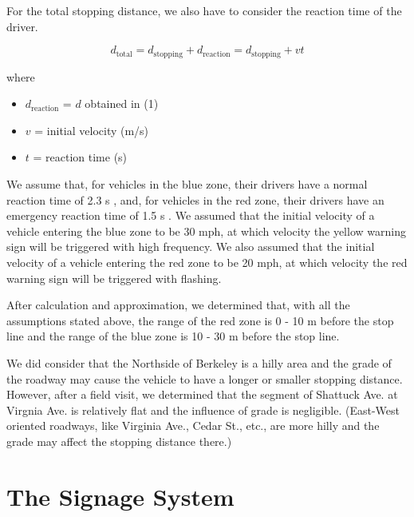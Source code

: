 \documentclass{article}
\begin{document}
For the total stopping distance, we also have to consider the reaction time of the driver.

\begin{equation}
d_{\text{total}} = d_{\text{stopping}} + d_{\text{reaction}} = d_{\text{stopping}} + vt
\end{equation}

where 
\begin{itemize}[noitemsep]
    \item $d_{\text{reaction}}$ = $d$ obtained in (1)
    \item $v$ = initial velocity (m/s)
    \item $t$ = reaction time (s)
\end{itemize}

We assume that, for vehicles in the blue zone, their drivers have a normal reaction time of 2.3 s , and, for vehicles in the red zone, their drivers have an emergency reaction time of 1.5 s . We assumed that the initial velocity of a vehicle entering the blue zone to be 30 mph, at which velocity the yellow warning sign will be triggered with high frequency. We also assumed that the initial velocity of a vehicle entering the red zone to be 20 mph, at which velocity the red warning sign will be triggered with flashing.

After calculation and approximation, we determined that, with all the assumptions stated above, the range of the red zone is 0 - 10 m before the stop line and the range of the blue zone is 10 - 30 m before the stop line.

We did consider that the Northside of Berkeley is a hilly area and the grade of the roadway may cause the vehicle to have a longer or smaller stopping distance. However, after a field visit, we determined that the segment of Shattuck Ave. at Virgnia Ave. is relatively flat and the influence of grade is negligible. (East-West oriented roadways, like Virginia Ave., Cedar St., etc., are more hilly and the grade may affect the stopping distance there.)

\section{The Signage System}
\end{document}
